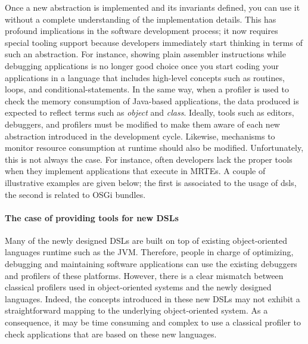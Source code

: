 Once a new abstraction is implemented and its invariants defined, you can use it without a complete understanding of the implementation details.
This has profound implications in the software development process; it now requires special tooling support because developers immediately start thinking in terms of such an abstraction.
For instance, showing plain assembler instructions while debugging applications is no longer good choice once you start coding your applications in a language that includes high-level concepts such as routines, loops, and conditional-statements.
In the same way, when a profiler is used to check the memory consumption of Java-based applications, the data produced is expected to reflect terms such as \textit{object} and \textit{class}.
Ideally, tools such as editors, debuggers, and profilers must be modified to make them aware of each new abstraction introduced in the development cycle.
Likewise, mechanisms to monitor resource consumption at runtime should also be modified.
Unfortunately, this is not always the case.
For instance, often developers lack the proper tools when they implement applications that execute in MRTEs.
A couple of illustrative examples are given below; the first is associated to the usage of \glspl{dsl}, the second is related to OSGi bundles.

\paragraph{The case of providing tools for new DSLs}
Many of the newly designed DSLs are built on top of existing object-oriented languages runtime such as the JVM. 
Therefore, people in charge of optimizing, debugging and maintaining software applications can use the existing debuggers and profilers of these platforms. 
However, there is a clear mismatch between classical profilers used in object-oriented systems and the newly designed languages. 
Indeed, the concepts introduced in these new DSLs may not exhibit a straightforward mapping to the underlying object-oriented system.
As a consequence, it may be time consuming and complex to use a classical profiler to check applications that are based on these new languages.

